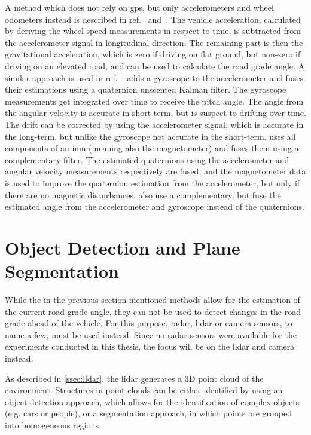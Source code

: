 A method which does not rely on \gls{gps}, but only accelerometers and wheel odometers instead is described in ref.~\cite{Nilsson2012} and~\cite{Palella2016}.
The vehicle acceleration, calculated by deriving the wheel speed measurements in respect to time, is subtracted from the accelerometer signal in longitudinal direction.
The remaining part is then the gravitational acceleration, which is zero if driving on flat ground, but non-zero if driving on an elevated road, and can be used to calculate the road grade angle.
A similar approach is used in ref.~\cite{Sentouh2008}.
\cite{He2020} adds a gyroscope to the accelerometer and fuses their estimations using a quaternion unscented Kalman filter.
The gyroscope measurements get integrated over time to receive the pitch angle.
The angle from the angular velocity is accurate in short-term, but is suspect to drifting over time.
The drift can be corrected by using the accelerometer signal, which is accurate in the long-term, but unlike the gyroscope not accurate in the short-term.
\cite{Wu2016} uses all components of an \gls{imu} (meaning also the magnetometer) and fuses them using a complementary filter.
The estimated quaternions using the accelerometer and angular velocity measurements respectively are fused, and the magnetometer data is used to improve the quaternion estimation from the accelerometer, but only if there are no magnetic disturbances.
\cite{Euston2008,Jauch2018} also use a complementary, but fuse the estimated angle from the accelerometer and gyroscope instead of the quaternions.



\section[Plane segmentation]{Object Detection and Plane Segmentation}
While the in the previous section mentioned methods allow for the estimation of the current road grade angle, they can not be used to detect changes in the road grade ahead of the vehicle.
For this purpose, \gls{radar}, \gls{lidar} or camera sensors, to name a few, must be used instead.
Since no \gls{radar} sensors were available for the experiments conducted in this thesis, the focus will be on the \gls{lidar} and camera instead.

As described in \cref{ssec:lidar}, the \gls{lidar} generates a 3D point cloud of the environment.
Structures in point clouds can be either identified by using an object detection approach, which allows for the identification of complex objects (e.g. cars or people), or a segmentation approach, in which points are grouped into homogeneous regions.

